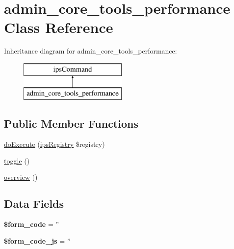 \hypertarget{classadmin__core__tools__performance}{\section{admin\-\_\-core\-\_\-tools\-\_\-performance Class Reference}
\label{classadmin__core__tools__performance}
}
Inheritance diagram for admin\-\_\-core\-\_\-tools\-\_\-performance\-:\begin{figure}[H]
\begin{center}
\leavevmode
\includegraphics[height=2.000000cm]{classadmin__core__tools__performance}
\end{center}
\end{figure}
\subsection*{Public Member Functions}
\begin{DoxyCompactItemize}
\item 
\hyperlink{classadmin__core__tools__performance_afbc4e912a0604b94d47d66744c64d8ba}{do\-Execute} (\hyperlink{classips_registry}{ips\-Registry} \$registry)
\item 
\hyperlink{classadmin__core__tools__performance_a09b3d50907f071311ad6088502e43108}{toggle} ()
\item 
\hyperlink{classadmin__core__tools__performance_a605d77b075a42b540e2fa25bc3db9045}{overview} ()
\end{DoxyCompactItemize}
\subsection*{Data Fields}
\begin{DoxyCompactItemize}
\item 
\hypertarget{classadmin__core__tools__performance_af28aee726fa3eb6c355d08a2ab655e03}{{\bfseries \$form\-\_\-code} = ''}\label{classadmin__core__tools__performance_af28aee726fa3eb6c355d08a2ab655e03}

\item 
\hypertarget{classadmin__core__tools__performance_ac68fe8a02a2efd63c3271179f4b4fbb7}{{\bfseries \$form\-\_\-code\-\_\-js} = ''}\label{classadmin__core__tools__performance_ac68fe8a02a2efd63c3271179f4b4fbb7}

\end{DoxyCompactItemize}
